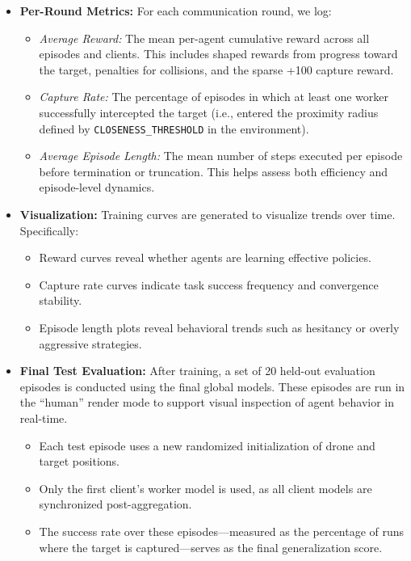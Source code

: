\documentclass[12pt,a4paper,twoside,openany]{book}
\begin{document}
\begin{itemize}
  \item \textbf{Per-Round Metrics:} For each communication round, we log:
  \begin{itemize}
    \item \textit{Average Reward:} The mean per-agent cumulative reward across all episodes and clients. This includes shaped rewards from progress toward the target, penalties for collisions, and the sparse +100 capture reward.
    \item \textit{Capture Rate:} The percentage of episodes in which at least one worker successfully intercepted the target (i.e., entered the proximity radius defined by \texttt{CLOSENESS\_THRESHOLD} in the environment).
    \item \textit{Average Episode Length:} The mean number of steps executed per episode before termination or truncation. This helps assess both efficiency and episode-level dynamics.
  \end{itemize}

  \item \textbf{Visualization:} Training curves are generated to visualize trends over time. Specifically:
  \begin{itemize}
    \item Reward curves reveal whether agents are learning effective policies.
    \item Capture rate curves indicate task success frequency and convergence stability.
    \item Episode length plots reveal behavioral trends such as hesitancy or overly aggressive strategies.
  \end{itemize}

  \item \textbf{Final Test Evaluation:} After training, a set of 20 held-out evaluation episodes is conducted using the final global models. These episodes are run in the ``human'' render mode to support visual inspection of agent behavior in real-time.
  \begin{itemize}
    \item Each test episode uses a new randomized initialization of drone and target positions.
    \item Only the first client’s worker model is used, as all client models are synchronized post-aggregation.
    \item The success rate over these episodes—measured as the percentage of runs where the target is captured—serves as the final generalization score.
  \end{itemize}
\end{itemize}
\end{document}
